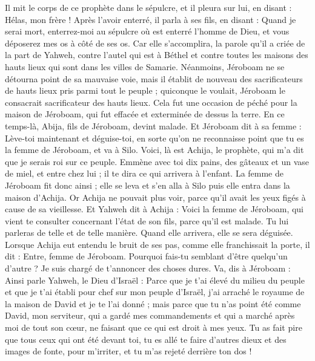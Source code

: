 \begin{multicols}{2}
Il mit le corps de ce prophète dans le sépulcre, et il pleura sur lui, en disant : Hélas, mon frère !
Après l'avoir enterré, il parla à ses fils, en disant : Quand je serai mort, enterrez-moi au sépulcre où est enterré l'homme de Dieu, et vous déposerez mes os à côté de ses os.
Car elle s'accomplira, la parole qu'il a criée de la part de Yahweh, contre l'autel qui est à Béthel et contre toutes les maisons des hauts lieux qui sont dans les villes de Samarie.
Néanmoins, Jéroboam ne se détourna point de sa mauvaise voie, mais il établit de nouveau des sacrificateurs de hauts lieux pris parmi tout le peuple ; quiconque le voulait, Jéroboam le consacrait sacrificateur des hauts lieux.
Cela fut une occasion de péché pour la maison de Jéroboam, qui fut effacée et exterminée de dessus la terre.
\VerseOne{}En ce temps-là, Abija, fils de Jéroboam, devint malade.
Et Jéroboam dit à sa femme : Lève-toi maintenant et déguise-toi, en sorte qu'on ne reconnaisse point que tu es la femme de Jéroboam, et va à Silo. Voici, là est Achija, le prophète, qui m'a dit que je serais roi sur ce peuple.
Emmène avec toi dix pains, des gâteaux et un vase de miel, et entre chez lui ; il te dira ce qui arrivera à l'enfant.
La femme de Jéroboam fit donc ainsi ; elle se leva et s'en alla à Silo puis elle entra dans la maison d'Achija. Or Achija ne pouvait plus voir, parce qu'il avait les yeux figés à cause de sa vieillesse.
Et Yahweh dit à Achija : Voici la femme de Jéroboam, qui vient te consulter concernant l'état de son fils, parce qu'il est malade. Tu lui parleras de telle et de telle manière. Quand elle arrivera, elle se sera déguisée.
Lorsque Achija eut entendu le bruit de ses pas, comme elle franchissait la porte, il dit : Entre, femme de Jéroboam. Pourquoi fais-tu semblant d'être quelqu'un d'autre ? Je suis chargé de t'annoncer des choses dures.
Va, dis à Jéroboam : Ainsi parle Yahweh, le Dieu d'Israël : Parce que je t'ai élevé du milieu du peuple et que je t'ai établi pour chef sur mon peuple d'Israël,
j'ai arraché le royaume de la maison de David et je te l'ai donné ; mais parce que tu n'as point été comme David, mon serviteur, qui a gardé mes commandements et qui a marché après moi de tout son cœur, ne faisant que ce qui est droit à mes yeux.
Tu as fait pire que tous ceux qui ont été devant toi, tu es allé te faire d'autres dieux et des images de fonte, pour m'irriter, et tu m'as rejeté derrière ton dos !

\end{multicols}
